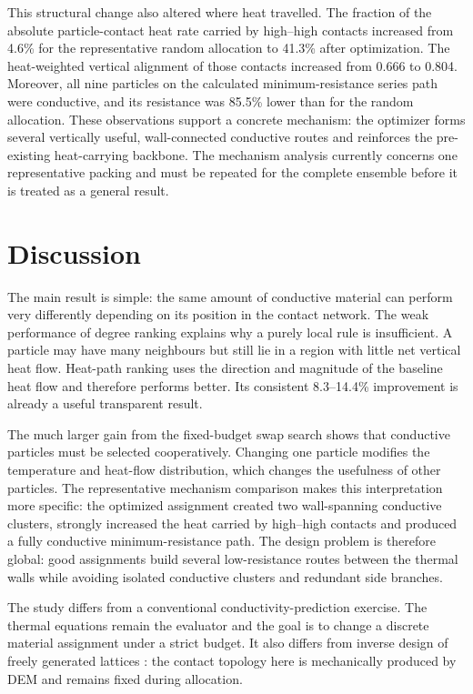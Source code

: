 \documentclass[12pt,a4paper]{article}
\begin{document}
	This structural change also altered where heat travelled. The fraction of the
	absolute particle-contact heat rate carried by high--high contacts increased
	from 4.6\% for the representative random allocation to 41.3\% after
	optimization. The heat-weighted vertical alignment of those contacts increased
	from 0.666 to 0.804. Moreover, all nine particles on the calculated
	minimum-resistance series path were conductive, and its resistance was 85.5\%
	lower than for the random allocation. These observations support a concrete
	mechanism: the optimizer forms several vertically useful, wall-connected
	conductive routes and reinforces the pre-existing heat-carrying backbone. The
	mechanism analysis currently concerns one representative packing and must be
	repeated for the complete ensemble before it is treated as a general result.
	
	\section{Discussion}
	
	The main result is simple: the same amount of conductive material can perform
	very differently depending on its position in the contact network. The weak
	performance of degree ranking explains why a purely local rule is insufficient.
	A particle may have many neighbours but still lie in a region with little net
	vertical heat flow. Heat-path ranking uses the direction and magnitude of the
	baseline heat flow and therefore performs better. Its consistent 8.3--14.4\%
	improvement is already a useful transparent result.
	
	The much larger gain from the fixed-budget swap search shows that conductive particles must
	be selected cooperatively. Changing one particle modifies the temperature and
	heat-flow distribution, which changes the usefulness of other particles. The
	representative mechanism comparison makes this interpretation more specific:
	the optimized assignment created two wall-spanning conductive clusters,
	strongly increased the heat carried by high--high contacts and produced a fully
	conductive minimum-resistance path. The design problem is therefore global:
	good assignments build several low-resistance routes between the thermal walls
	while avoiding isolated conductive clusters and redundant side branches.
	
	The study differs from a conventional conductivity-prediction exercise. The
	thermal equations remain the evaluator and the goal is to change a discrete
	material assignment under a strict budget. It also differs from inverse design
	of freely generated lattices \cite{Dold2023}: the contact topology here is
	mechanically produced by DEM and remains fixed during allocation.
\end{document}

